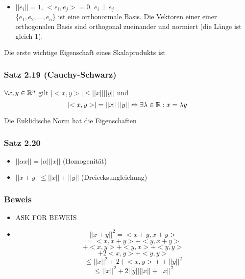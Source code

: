 \begin{definition}{2.17}
\begin{itemize}
\begin{center}
\begin{tikzpicture}[scale=1,smooth,
                        line cap=round,line join=round]
    \end{tikzpicture}
\end{center}

    \item $\left|\left|e_i\right|\right|=1$, $<e_i,e_j>=0$. $e_i \perp e_j$\\
$\{e_1,e_2,\dots,e_n\}$ ist eine orthonormale Basis. Die Vektoren einer einer orthogonalen Basis sind orthogonal zueinander und normiert (die Länge ist gleich 1).
\end{itemize}
\end{definition}
Die erste wichtige Eigenschaft eines Skalaprodukts ist
\subsubsection*{Satz 2.19 (Cauchy-Schwarz)}
$\forall x,y\in\R^n$ gilt $\left| <x,y>\right| \leq \left|\left| x\right|\right| \left|\left| y\right|\right|$ und \[\left| <x,y>\right|=\left|\left| x\right|\right| \left|\left| y\right|\right|\Leftrightarrow \exists\lambda\in\R: x=\lambda y\]

Die Euklidische Norm hat die Eigenschaften
\subsubsection*{Satz 2.20}
\begin{itemize}
    \item $\left|\left| \alpha x\right|\right|=\left|\alpha\right|\left|\left| x\right|\right|$ (Homogenität)
    \item $\left|\left| x+y\right|\right| \leq \left|\left| x\right|\right| + \left|\left| y\right|\right|$ (Dreiecksungleichung)
\end{itemize}

\subsubsection*{Beweis}
\begin{itemize}
    \item ASK FOR BEWEIS 
    \item \[{\left|\left| x+y\right|\right|}^2=<x+y,x+y>\]
\[=<x,x+y>+<y,x+y>\]
\[<x,x>+<x,y>+<y,x>+<y,y>\]
\[<x,x>+2<x,y>+<y,y>\]
\[\leq {\left|\left| x \right|\right|}^2 + 2\left( <x,y>\right) + {\left|\left| y \right|\right|}^2\]
\[\leq {\left|\left| x \right|\right|}^2 + 2{\left|\left| y \right|\right|}  {\left|\left| x \right|\right|} + {\left|\left| x \right|\right|}^2\]
\end{itemize}

